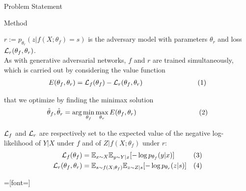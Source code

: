 \documentclass[final]{beamer}
\begin{document}
\begin{frame}{}
\begin{textblock}{0.32}
\begin{block}{Problem Statement \phantom{p}}
\end{block}

\vspace{0.5cm}
\begin{block}{Method \phantom{p}}



$r := p_{\theta_r}(z | f(X;\theta_f)=s)$ is the adversary model with parameters $\theta_r$ and loss ${\cal L}_r(\theta_f, \theta_r)$. \\
As with generative adversarial networks, $f$ and $r$ are trained simultaneously, which is carried out by considering
the value function
\begin{align}
\nonumber E(\theta_f, \theta_r) = {\cal L}_f(\theta_f) - {\cal L}_r(\theta_f, \theta_r)  &&\text{\hspace{2.35cm} (1)}
\end{align}

that we optimize by finding the minimax solution 
\begin{align}
\nonumber \smash{\hat\theta_f, \hat\theta_r} = \arg \min_{\theta_f} \max_{\theta_r} E(\theta_f, \theta_r)&&\text{\hspace{2.75cm} (2)}
\end{align}

${\cal L}_f$ and ${\cal L}_r$  are respectively set to the
expected value of the
negative log-likelihood of $Y|X$ under $f$ and of $Z|f(X;\theta_f)$ under
$r$: 
\begin{align}
    \nonumber {\cal L}_f(\theta_f) &= \mathbb{E}_{x \sim X}  \mathbb{E}_{y \sim Y|x} [ -\log p_{\theta_f} (y|x) ] &\text{(3)}\\
    \nonumber {\cal L}_r(\theta_f, \theta_r) &= \mathbb{E}_{s \sim f(X;\theta_f)}  \mathbb{E}_{z \sim Z|s} [-\log p_{\theta_r} (z|s)]&\text{(4)}
\end{align}


\vspace{0.2cm}
\begin{center}
=[font=\fontsize{10}{11.2}]
\begin{figure}
  
   \def\layersep{1cm}

\end{figure}
\end{center}
\end{block}
\end{textblock}
\end{frame}
\end{document}
